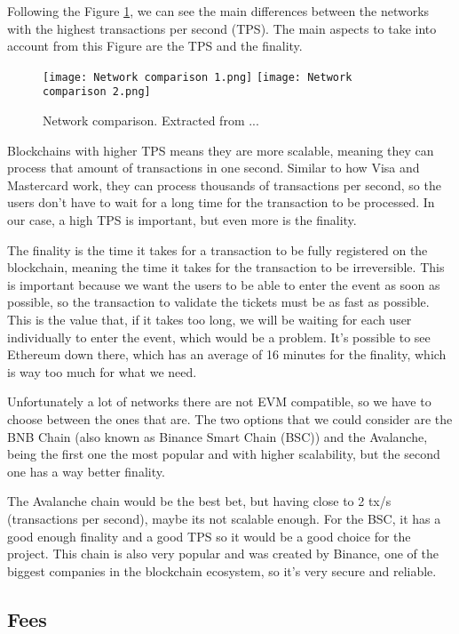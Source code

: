 Following the Figure \ref{fig:network_comparison}, we can see the main
differences between the networks with the highest transactions per second
(TPS). The main aspects to take into account from this Figure are the TPS and
the finality.

\begin{figure}[H]
	\texttt{[image: Network comparison 1.png]}
	\texttt{[image: Network comparison 2.png]}
	\centering
	\caption{Network comparison. Extracted from ...}
	\label{fig:network_comparison}
\end{figure}

Blockchains with higher TPS means they are more scalable, meaning they can
process that amount of transactions in one second. Similar to how Visa and
Mastercard work, they can process thousands of transactions per second, so the
users don't have to wait for a long time for the transaction to be processed.
In our case, a high TPS is important, but even more is the finality.

The finality is the time it takes for a transaction to be fully registered on
the blockchain, meaning the time it takes for the transaction to be
irreversible. This is important because we want the users to be able to enter
the event as soon as possible, so the transaction to validate the tickets must
be as fast as possible. This is the value that, if it takes too long, we will
be waiting for each user individually to enter the event, which would be a
problem. It's possible to see Ethereum down there, which has an average of 16
minutes for the finality, which is way too much for what we need.

Unfortunately a lot of networks there are not EVM compatible, so we have to
choose between the ones that are. The two options that we could consider are
the BNB Chain (also known as Binance Smart Chain (BSC)) and the Avalanche,
being the first one the most popular and with higher scalability, but the
second one has a way better finality.

The Avalanche chain would be the best bet, but having close to 2 tx/s
(transactions per second), maybe its not scalable enough. For the BSC, it has a
good enough finality and a good TPS so it would be a good choice for the
project. This chain is also very popular and was created by Binance, one of the
biggest companies in the blockchain ecosystem, so it's very secure and
reliable.

\subsection{Fees}
\label{subsec:fees}


